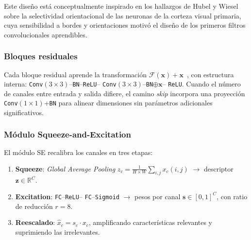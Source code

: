 Este diseño está conceptualmente inspirado en los hallazgos de
Hubel y Wiesel~\cite{hubel1959receptive} sobre la selectividad
orientacional de las neuronas de la corteza visual primaria, cuya
sensibilidad a bordes y orientaciones motivó el diseño de los
primeros filtros convolucionales aprendibles.

\subsubsection*{Bloques residuales}

Cada bloque residual aprende la transformación
$\mathcal{F}(\mathbf{x}) {+} \mathbf{x}$~\cite{he2016resnet},
con estructura interna:
\texttt{Conv}$(3{\times}3)$--\texttt{BN}--\texttt{ReLU}--%
\texttt{Conv}$(3{\times}3)$--\texttt{BN}$\oplus\mathbf{x}$--%
\texttt{ReLU}.
Cuando el número de canales entre entrada y salida difiere,
el camino \textit{skip} incorpora una proyección
\texttt{Conv}$(1{\times}1)${+}\texttt{BN}
para alinear dimensiones sin parámetros adicionales
significativos.

\subsubsection*{Módulo Squeeze-and-Excitation}

El módulo SE recalibra los canales en tres etapas:

\begin{enumerate}
  \item \textbf{Squeeze}: \textit{Global Average Pooling}
        $z_c = \frac{1}{H{\times}W}\sum_{i,j} x_c(i,j)$
        $\to$ descriptor $\mathbf{z}\in\mathbb{R}^C$.
  \item \textbf{Excitation}: \texttt{FC}--\texttt{ReLU}--%
        \texttt{FC}--\texttt{Sigmoid} $\to$ pesos por canal
        $\mathbf{s}\in[0,1]^C$, con ratio de reducción $r{=}8$.
  \item \textbf{Reescalado}: $\hat{x}_c = s_c \cdot x_c$,
        amplificando características relevantes y suprimiendo
        las irrelevantes.
\end{enumerate}

